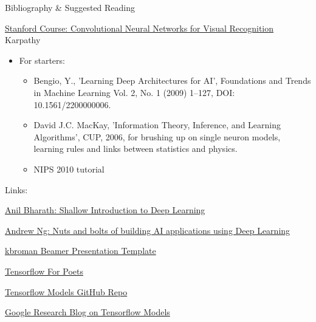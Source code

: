 \documentclass[12pt,t]{beamer}
\begin{document}
\begin{frame}

Bibliography \& Suggested Reading

\href{http://vision.stanford.edu/teaching/cs231n/syllabus.html}{Stanford Course: Convolutional Neural Networks for Visual Recognition}
Karpathy 

\begin{itemize}
 
\item For starters: 
 
	\begin{itemize}

	\item Bengio, Y., 'Learning Deep Architectures for AI', Foundations and Trends in Machine Learning Vol. 2, No. 1 (2009) 1–127, DOI: 10.1561/2200000006.
	\item David J.C. MacKay, 'Information Theory, Inference, and Learning Algorithms', CUP, 2006, for brushing up on single neuron models, learning rules and links between statistics and physics. 
	\item NIPS 2010 tutorial

	\end{itemize}
	
\end{itemize}

\end{frame}

\begin{frame}

Links:

\href{http://bicv.org/downloads/Shallow_Introduction_to_Deep_Learning-Jan_30_2014.pdf}{Anil Bharath: Shallow Introduction to Deep Learning} 

\href{https://media.nips.cc/Conferences/2016/Slides/6203-Slides.pdf}{Andrew Ng: Nuts and bolts of building AI applications using Deep Learning}

\href{https://kbroman.wordpress.com/2013/10/07/better-looking-latexbeamer-slides/}{kbroman Beamer Presentation Template}

\href{https://codelabs.developers.google.com/codelabs/tensorflow-for-poets}{Tensorflow For Poets}
 
\href{ https://github.com/tensorflow/models}{Tensorflow Models GitHub Repo}

\href{https://research.googleblog.com}{Google Research Blog on Tensorflow Models}
 
\end{frame}
\end{document}
